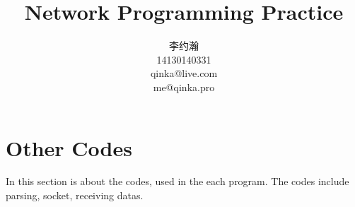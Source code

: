 \documentclass{article}
\title{Network Programming Practice}
\author{李约瀚 \\ 14130140331 \\ qinka@live.com \\ me@qinka.pro}
\newcounter{codeline}
\def\inputHaskell#1{\setcounter{codeline}{1}\setcounter{codeline}{1}}
\begin{document}
    \maketitle
    \newpage
    \tableofcontents
    \newpage
    \inputHaskell{src/Network/Netutils/WWW.lhs}
    \inputHaskell{src/Network/Netutils/FTP.lhs}
    \inputHaskell{src/Network/Netutils/POP.lhs}
    \inputHaskell{src/Network/Netutils/ScanIP.lhs}
    \inputHaskell{src/Network/Netutils/ScanPort.lhs}

    \section{Other Codes}
    \label{sec:oc}
    
    In this section is about the codes, used in the each program.
    The codes include parsing, socket, receiving datas.
    
    \inputHaskell{app/Main.lhs}
    \inputHaskell{src/Network/Netutils/Parsers.lhs}
    \inputHaskell{src/Network/Netutils/GTK.lhs}
    \inputHaskell{src/Network/Netutils/Socket.lhs}
\end{document}
